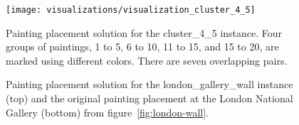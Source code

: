 \begin{figure}[h!]
    \texttt{[image: visualizations/visualization\_cluster\_4\_5]}
    \caption[Painting placement solution for the cluster\_4\_5 instance]
        { Painting placement solution for the cluster\_4\_5 instance.
    Four groups of paintings, 1 to 5, 6 to 10, 11 to 15, and 15 to 20, are marked using different colors.
    There are seven overlapping pairs.}
    \label{fig:results:visualization-cluster-4-5}
\end{figure}

\begin{figure}[h!]
    \centering

    \caption[Painting placement solution for the london\_gallery\_wall instance]
        {Painting placement solution for the london\_gallery\_wall instance (top) and the original painting placement at the London National Gallery (bottom) from figure~\ref{fig:london-wall}.}
    \label{fig:results:visualization-london-gallery-wall}%
\end{figure}
